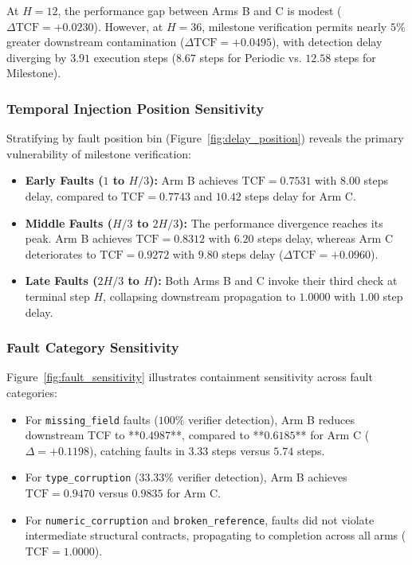 At $H=12$, the performance gap between Arms B and C is modest ($\Delta \text{TCF} = +0.0230$). However, at $H=36$, milestone verification permits nearly $5\%$ greater downstream contamination ($\Delta \text{TCF} = +0.0495$), with detection delay diverging by $3.91$ execution steps ($8.67$ steps for Periodic vs. $12.58$ steps for Milestone).

\subsubsection{Temporal Injection Position Sensitivity}
Stratifying by fault position bin (Figure~\ref{fig:delay_position}) reveals the primary vulnerability of milestone verification:
\begin{itemize}
    \item \textbf{Early Faults ($1$ to $H/3$):} Arm B achieves $\text{TCF} = 0.7531$ with $8.00$ steps delay, compared to $\text{TCF} = 0.7743$ and $10.42$ steps delay for Arm C.
    \item \textbf{Middle Faults ($H/3$ to $2H/3$):} The performance divergence reaches its peak. Arm B achieves $\text{TCF} = 0.8312$ with $6.20$ steps delay, whereas Arm C deteriorates to $\text{TCF} = 0.9272$ with $9.80$ steps delay ($\Delta \text{TCF} = +0.0960$).
    \item \textbf{Late Faults ($2H/3$ to $H$):} Both Arms B and C invoke their third check at terminal step $H$, collapsing downstream propagation to $1.0000$ with $1.00$ step delay.
\end{itemize}

\subsubsection{Fault Category Sensitivity}
Figure~\ref{fig:fault_sensitivity} illustrates containment sensitivity across fault categories:
\begin{itemize}
    \item For \texttt{missing\_field} faults ($100\%$ verifier detection), Arm B reduces downstream TCF to **$0.4987$**, compared to **$0.6185$** for Arm C ($\Delta = +0.1198$), catching faults in $3.33$ steps versus $5.74$ steps.
    \item For \texttt{type\_corruption} ($33.33\%$ verifier detection), Arm B achieves $\text{TCF} = 0.9470$ versus $0.9835$ for Arm C.
    \item For \texttt{numeric\_corruption} and \texttt{broken\_reference}, faults did not violate intermediate structural contracts, propagating to completion across all arms ($\text{TCF} = 1.0000$).
\end{itemize}

